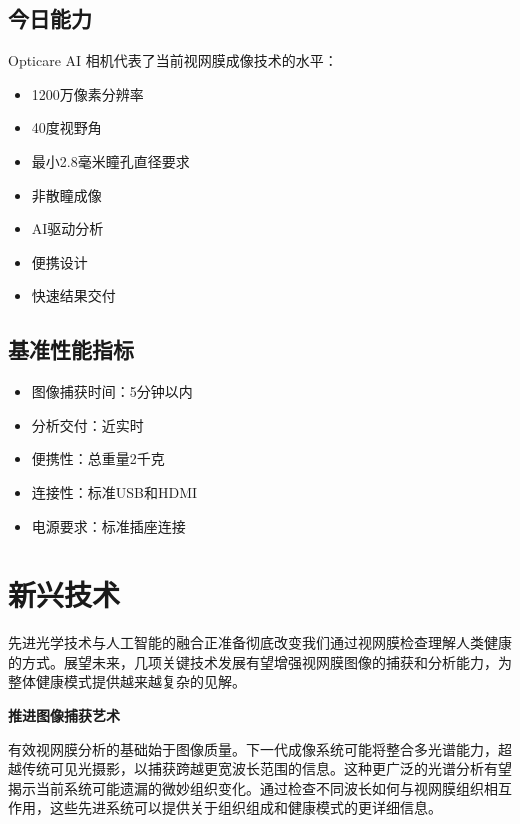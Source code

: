\documentclass[
  Letterpaper,
]{scrbook}
\providecommand{\tightlist}{%
  \setlength{\itemsep}{0pt}\setlength{\parskip}{0pt}}\usepackage{longtable,booktabs,array}
\begin{document}
\subsection*{今日能力}\label{ux4ecaux65e5ux80fdux529b}

Opticare AI 相机代表了当前视网膜成像技术的水平：

\begin{itemize}
\tightlist
\item
  1200万像素分辨率
\item
  40度视野角
\item
  最小2.8毫米瞳孔直径要求
\item
  非散瞳成像
\item
  AI驱动分析
\item
  便携设计
\item
  快速结果交付
\end{itemize}

\subsection*{基准性能指标}\label{ux57faux51c6ux6027ux80fdux6307ux6807}

\begin{itemize}
\tightlist
\item
  图像捕获时间：5分钟以内
\item
  分析交付：近实时
\item
  便携性：总重量2千克
\item
  连接性：标准USB和HDMI
\item
  电源要求：标准插座连接
\end{itemize}

\section{新兴技术}\label{ux65b0ux5174ux6280ux672f}

先进光学技术与人工智能的融合正准备彻底改变我们通过视网膜检查理解人类健康的方式。展望未来，几项关键技术发展有望增强视网膜图像的捕获和分析能力，为整体健康模式提供越来越复杂的见解。

\textbf{推进图像捕获艺术}

有效视网膜分析的基础始于图像质量。下一代成像系统可能将整合多光谱能力，超越传统可见光摄影，以捕获跨越更宽波长范围的信息。这种更广泛的光谱分析有望揭示当前系统可能遗漏的微妙组织变化。通过检查不同波长如何与视网膜组织相互作用，这些先进系统可以提供关于组织组成和健康模式的更详细信息。
\end{document}
